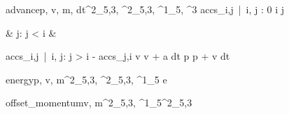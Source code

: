 \documentclass[12pt,a4paper]{book}
\begin{document}
\begin{eqcode}{advance}{p, v, m, dt}{^2_{5,3}, ^2_{5,3}, ^1_5, }{^3}
    accs_{i,j}\  |\  i, j : 0 \leq i   \leq j  \gets
        \begin{cases}
             & j:  j < i  & \otherwise \lend
        \end{cases} \lend
    accs_{i,j}\  |\  i, j:  j > i \gets - accs_{j,i} \lend
    v \gets v + a \cdot dt \lend
    p \gets p + v \cdot dt \lend
\end{eqcode}

\begin{eqcode}{energy}{p, v, m}{^2_{5,3},
    ^2_{5,3}, ^1_5}{}
    e \in {} \lend
     \lend
\end{eqcode}

\begin{eqcode}{offset\_momentum}{v, m}{^2_{5,3}, ^1_5}{^2_{5,3}}
     \lend
\end{eqcode}
\end{document}
